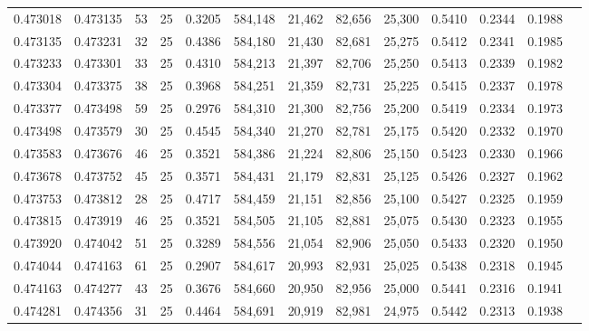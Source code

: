 \begin{tabular}{rrrrrrrrrrrrr}
0.473018 & 0.473135 &    53 &  25 &                                     0.3205 & 584,148 &  21,462 &  82,656 &  25,300 & 0.5410 & 0.2344 & 0.1988 \\
0.473135 & 0.473231 &    32 &  25 &                                     0.4386 & 584,180 &  21,430 &  82,681 &  25,275 & 0.5412 & 0.2341 & 0.1985 \\
0.473233 & 0.473301 &    33 &  25 &                                     0.4310 & 584,213 &  21,397 &  82,706 &  25,250 & 0.5413 & 0.2339 & 0.1982 \\
0.473304 & 0.473375 &    38 &  25 &                                     0.3968 & 584,251 &  21,359 &  82,731 &  25,225 & 0.5415 & 0.2337 & 0.1978 \\
0.473377 & 0.473498 &    59 &  25 &                                     0.2976 & 584,310 &  21,300 &  82,756 &  25,200 & 0.5419 & 0.2334 & 0.1973 \\
0.473498 & 0.473579 &    30 &  25 &                                     0.4545 & 584,340 &  21,270 &  82,781 &  25,175 & 0.5420 & 0.2332 & 0.1970 \\
0.473583 & 0.473676 &    46 &  25 &                                     0.3521 & 584,386 &  21,224 &  82,806 &  25,150 & 0.5423 & 0.2330 & 0.1966 \\
0.473678 & 0.473752 &    45 &  25 &                                     0.3571 & 584,431 &  21,179 &  82,831 &  25,125 & 0.5426 & 0.2327 & 0.1962 \\
0.473753 & 0.473812 &    28 &  25 &                                     0.4717 & 584,459 &  21,151 &  82,856 &  25,100 & 0.5427 & 0.2325 & 0.1959 \\
0.473815 & 0.473919 &    46 &  25 &                                     0.3521 & 584,505 &  21,105 &  82,881 &  25,075 & 0.5430 & 0.2323 & 0.1955 \\
0.473920 & 0.474042 &    51 &  25 &                                     0.3289 & 584,556 &  21,054 &  82,906 &  25,050 & 0.5433 & 0.2320 & 0.1950 \\
0.474044 & 0.474163 &    61 &  25 &                                     0.2907 & 584,617 &  20,993 &  82,931 &  25,025 & 0.5438 & 0.2318 & 0.1945 \\
0.474163 & 0.474277 &    43 &  25 &                                     0.3676 & 584,660 &  20,950 &  82,956 &  25,000 & 0.5441 & 0.2316 & 0.1941 \\
0.474281 & 0.474356 &    31 &  25 &                                     0.4464 & 584,691 &  20,919 &  82,981 &  24,975 & 0.5442 & 0.2313 & 0.1938 \\

\end{tabular}
